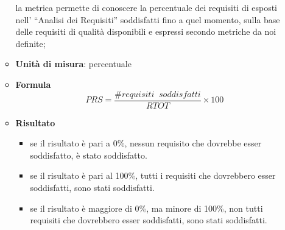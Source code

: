 \begin{itemize}
\begin{itemize}
								la metrica permette di conoscere la percentuale dei requisiti di esposti nell’ “Analisi dei Requisiti” soddisfatti fino a quel momento, sulla base delle requisiti di qualità disponibili e espressi secondo metriche da noi definite;\\
							\item\textbf{Unità di misura}: percentuale
							\item\textbf{Formula}\\
								\[PRS = \frac{\mathit{\#requisiti\;\;soddisfatti}}{\mathit{RTOT}} \times 100 \]
							\item\textbf{Risultato}\\
								\begin{itemize}
									\item se il risultato è pari a 0\%, nessun requisito che dovrebbe esser soddisfatto, è stato soddisfatto.
									\item se il risultato è pari al 100\%, tutti i requisiti che dovrebbero esser soddisfatti,  sono stati soddisfatti.
									\item se il risultato è maggiore di 0\%, ma minore di 100\%, non tutti requisiti che dovrebbero esser soddisfatti, sono stati soddisfatti.
								\end{itemize}
						\end{itemize}
				\end{itemize}

	
